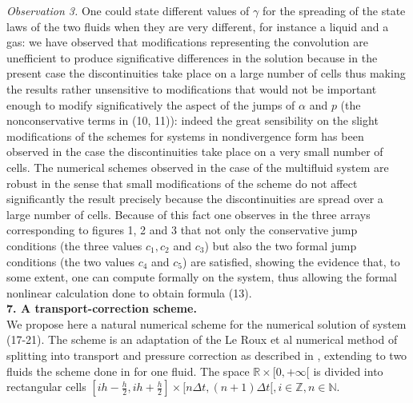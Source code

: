\documentclass[a4paper,12pt]{article}
\begin{document}
 \begin{figure}[h]\centering\end{figure}



 


\textit{Observation 3.} One could state different values of $\gamma$ for the spreading of the state laws of the two fluids when they are very different, for instance a liquid and a gas: we have observed that modifications representing the convolution are unefficient to produce significative differences in the solution because in the present case the discontinuities take place on a large number of cells thus making the results rather unsensitive to modifications that would not be important enough to modify significatively  the aspect of the jumps of $\alpha$ and $p$ (the nonconservative terms in (10, 11)): indeed the great sensibility on the slight modifications of the  schemes for systems in nondivergence form  has been observed  in the case the discontinuities take place on a very small number of cells. The numerical schemes observed  in the case of the multifluid system are robust in the sense that small modifications of the scheme do not affect significantly the result precisely because the discontinuities are spread over a large number of cells. Because of this fact one observes in the three arrays corresponding to figures 1, 2 and 3 that not only the conservative jump conditions (the three  values $c_1,c_2$ and $c_3$) but also the two formal jump conditions (the two values $c_4$ and $c_5$) are satisfied, showing the evidence that, to some extent, one can compute formally on the system, thus allowing the formal nonlinear calculation done to obtain formula (13).\\ 




  


\textbf{7. A  transport-correction scheme.}\\
We propose here a natural numerical scheme for the numerical solution of system (17-21).   The scheme is  an adaptation of the  Le Roux et al numerical method of splitting  into transport  and pressure correction  as described in \cite{Baraille},  extending to two fluids the scheme done in \cite{ColombeauNMPDE} for one  fluid. The space $\mathbb{R}\times [0,+\infty[$  is divided into rectangular cells $[ih-\frac{h}{2},ih+\frac{h}{2}]\times [n\Delta t, (n+1)\Delta t[, i\in\mathbb{Z}, n\in\mathbb{N}$.\\
\end{document}
